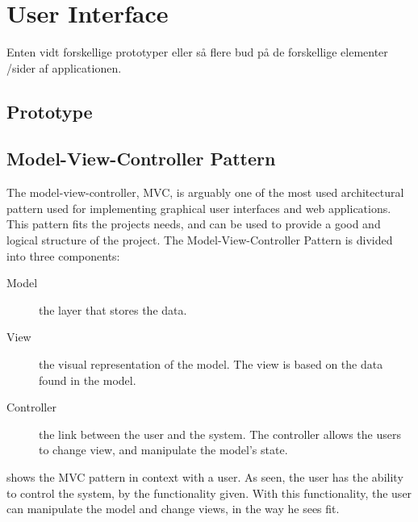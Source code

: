 \section{User Interface}\label{sec:user-interface}

Enten vidt forskellige prototyper eller så flere bud på de forskellige elementer /sider af applicationen.



\subsection{Prototype}



\subsection{Model-View-Controller Pattern}\label{subsec:model-view-controller-pattern}
The model-view-controller, MVC, is arguably one of the most used architectural pattern used for implementing graphical user interfaces and web applications. This pattern fits the projects needs, and can be used to provide a good and logical structure of the project. The Model-View-Controller Pattern is divided into three components:
\begin{description}
\item[Model] the layer that stores the data. 
\item[View] the visual representation of the model. The view is based on the data found in the model.
\item[Controller] the link between the user and the system. The controller allows the users to change view, and manipulate the model's state. 
\end{description}

 shows the MVC pattern in context with a user. As seen, the user has the ability to control the system, by the functionality given. With this functionality, the user can manipulate the model and change views, in the way he sees fit. 

